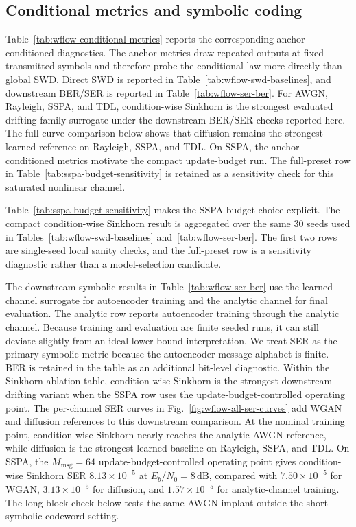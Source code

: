 \documentclass[10pt,journal]{IEEEtran}
\begin{document}
\subsection{Conditional metrics and symbolic coding}
Table~\ref{tab:wflow-conditional-metrics} reports the corresponding anchor-conditioned diagnostics.
The anchor metrics draw repeated outputs at fixed transmitted symbols and therefore probe the conditional law more directly than global SWD.
Direct SWD is reported in Table~\ref{tab:wflow-swd-baselines}, and downstream BER/SER is reported in Table~\ref{tab:wflow-ser-ber}.
For AWGN, Rayleigh, SSPA, and TDL, condition-wise Sinkhorn is the strongest evaluated drifting-family surrogate under the downstream BER/SER checks reported here.
The full curve comparison below shows that diffusion remains the strongest learned reference on Rayleigh, SSPA, and TDL.
On SSPA, the anchor-conditioned metrics motivate the compact update-budget run.
The full-preset row in Table~\ref{tab:sspa-budget-sensitivity} is retained as a sensitivity check for this saturated nonlinear channel.



Table~\ref{tab:sspa-budget-sensitivity} makes the SSPA budget choice explicit.
The compact condition-wise Sinkhorn result is aggregated over the same 30 seeds used in Tables~\ref{tab:wflow-swd-baselines} and~\ref{tab:wflow-ser-ber}.
The first two rows are single-seed local sanity checks, and the full-preset row is a sensitivity diagnostic rather than a model-selection candidate.



The downstream symbolic results in Table~\ref{tab:wflow-ser-ber} use the learned channel surrogate for autoencoder training and the analytic channel for final evaluation.
The analytic row reports autoencoder training through the analytic channel.
Because training and evaluation are finite seeded runs, it can still deviate slightly from an ideal lower-bound interpretation.
We treat SER as the primary symbolic metric because the autoencoder message alphabet is finite.
BER is retained in the table as an additional bit-level diagnostic.
Within the Sinkhorn ablation table, condition-wise Sinkhorn is the strongest downstream drifting variant when the SSPA row uses the update-budget-controlled operating point.
The per-channel SER curves in Fig.~\ref{fig:wflow-all-ser-curves} add WGAN and diffusion references to this downstream comparison.
At the nominal training point, condition-wise Sinkhorn nearly reaches the analytic AWGN reference, while diffusion is the strongest learned baseline on Rayleigh, SSPA, and TDL.
On SSPA, the \(M_{\mathrm{msg}}=64\) update-budget-controlled operating point gives condition-wise Sinkhorn SER \(8.13\times10^{-5}\) at \(E_b/N_0=8\,\mathrm{dB}\), compared with \(7.50\times10^{-5}\) for WGAN, \(3.13\times10^{-5}\) for diffusion, and \(1.57\times10^{-5}\) for analytic-channel training.
The long-block check below tests the same AWGN implant outside the short symbolic-codeword setting.
\end{document}
